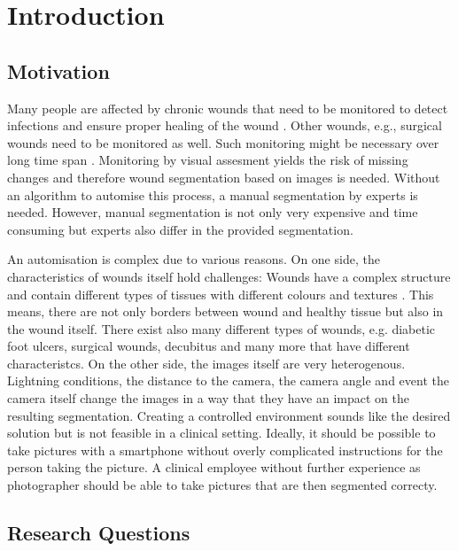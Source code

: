 \section{Introduction}

\subsection{Motivation}

Many people are affected by chronic wounds that need to be monitored to detect infections and ensure proper healing of the wound \cite{DFUC2022}. Other wounds, e.g., surgical wounds need to be monitored as well. Such monitoring might be necessary over long time span \cite{DFUC2022}. Monitoring by visual assesment yields the risk of missing changes and therefore wound segmentation based on images is needed. Without an algorithm to automise this process, a manual segmentation by experts is needed. However, manual segmentation is not only very expensive and time consuming but experts also differ in the provided segmentation.

An automisation is complex due to various reasons. On one side, the characteristics of wounds itself hold challenges: Wounds have a complex structure and contain different types of tissues with different colours and textures \cite{AhmadFauzi2015}. This means, there are not only borders between wound and healthy tissue but also in the wound itself. There exist also many different types of wounds, e.g. diabetic foot ulcers, surgical wounds, decubitus and many more that have different characteristcs. On the other side, the images itself are very heterogenous. Lightning conditions, the distance to the camera, the camera angle and event the camera itself change the images in a way that they have an impact on the resulting segmentation. Creating a controlled environment sounds like the desired solution but is not feasible in a clinical setting. Ideally, it should be possible to take pictures with a smartphone without overly complicated instructions for the person taking the picture. A clinical employee without further experience as photographer should be able to take pictures that are then segmented correcty.

\subsection{Research Questions}

